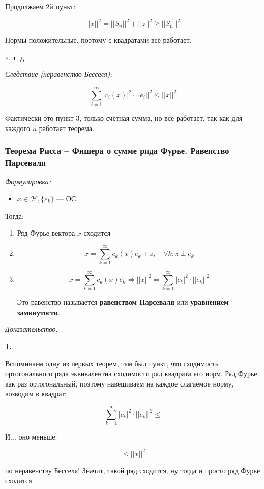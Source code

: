 \documentclass{article}
\begin{document}
Продолжаем 2й пункт:

\[||x||^2 = ||S_n||^2 + ||z||^2 \ge ||S_n||^2\]

Нормы положительные, поэтому с квадратами всё работает.

ч. т. д. 

\textit{Следствие (неравенство Бесселя): }

\[\sum_{i = 1}^{\infty} |c_i(x)|^2 \cdot ||e_i||^2 \le ||x||^2\]

Фактически это пункт 3, только счётная сумма, но всё работает, так как для каждого $n$ работает теорема.

\subsubsection{Теорема Рисса -- Фишера о сумме ряда Фурье. Равенство Парсеваля}
\textit{Формулировка:}

\begin{itemize}
    \item $x \in \mathcal{H}, \{e_k\}$ --- ОС
\end{itemize}

Тогда:

\begin{enumerate}
    \item Ряд Фурье вектора $x$ сходится
    \item \[x = \sum_{k = 1}^{\infty} c_k(x)e_k + z, \quad \forall k: z \perp e_k\]
    \item \[x = \sum_{k = 1}^{\infty} c_k(x)e_k \Leftrightarrow ||x||^2 = \sum_{k = 1}^{\infty} |c_k|^2 \cdot ||e_k||^2\]
    
    Это равенство называется \textbf{равенством Парсеваля} или \textbf{уравнением замкнутости}.
\end{enumerate}

\textit{Доказательство:}

\textbf{1.}

Вспоминаем одну из первых теорем, там был пункт, что сходимость ортогонального ряда эквивалентна сходимости ряд квадрата его норм. Ряд Фурье как раз ортогональный, поэтому навешиваем на каждое слагаемое норму, возводим в квадрат:

\[\sum_{k = 1}^{\infty} |c_k|^2 \cdot ||e_k||^2 \le\]

И... оно меньше:

\[\le ||x||^2\] 

по неравенству Бесселя! Значит, такой ряд сходится, ну тогда и просто ряд Фурье сходится.
\end{document}

